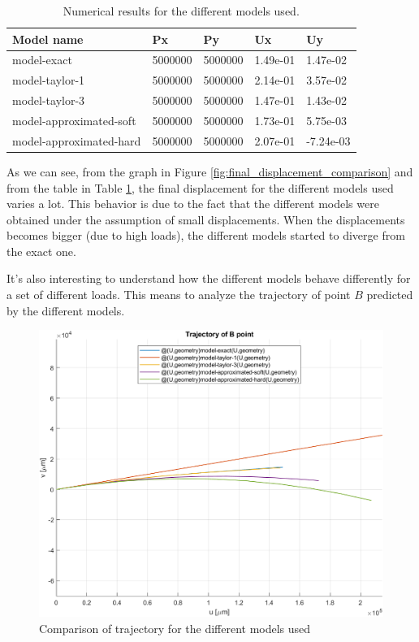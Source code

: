 \begin{table}[H]
    \centering
    \begin{tabular}{|l|l|l|l|l|}
        \hline
        \textbf{Model name}     & \textbf{Px} & \textbf{Py} & \textbf{Ux} & \textbf{Uy} \\ \hline
        model-exact             & 5000000     & 5000000     & 1.49e-01    & 1.47e-02    \\ \hline
        model-taylor-1          & 5000000     & 5000000     & 2.14e-01    & 3.57e-02    \\ \hline
        model-taylor-3          & 5000000     & 5000000     & 1.47e-01    & 1.43e-02    \\ \hline
        model-approximated-soft & 5000000     & 5000000     & 1.73e-01    & 5.75e-03    \\ \hline
        model-approximated-hard & 5000000     & 5000000     & 2.07e-01    & -7.24e-03   \\ \hline
    \end{tabular}
    \caption{Numerical results for the different models used.}
    \label{tab:results_Px5000000_Py5000000}
\end{table}

As we can see, from the graph in Figure \ref{fig:final_displacement_comparison} and from the table in Table \ref{tab:results_Px5000000_Py5000000}, the final displacement for the different models used varies a lot.
This behavior is due to the fact that the different models were obtained under the assumption of small displacements.
When the displacements becomes bigger (due to high loads), the different models started to diverge from the exact one.

It's also interesting to understand how the different models behave differently for a set of different loads.
This means to analyze the trajectory of point $B$ predicted by the different models.

\begin{figure}[H]
    \centering
    \includegraphics[width=.7\textwidth]{img/trajectory_comparison_Px5000000_Py5000000}
    \caption{Comparison of trajectory for the different models used}
    \label{fig:trajectory_comparison}
\end{figure}

